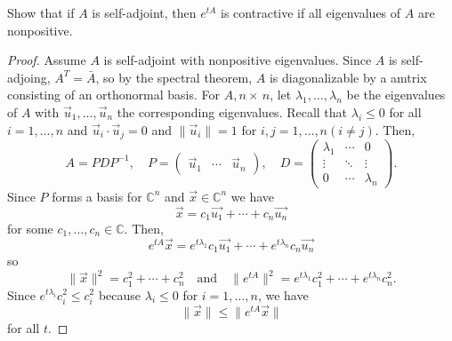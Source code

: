 \documentclass{exam}
\newcommand{\CC}{\mathbb C}
\begin{document}
    \begin{questions}
        \question Show that if $A$ is self-adjoint, then $e^{tA}$ is contractive if all eigenvalues of $A$ are nonpositive. 
        \begin{solution}
            \begin{proof}
                Assume $A$ is self-adjoint with nonpositive eigenvalues. Since $A$ is self-adjoing, $A^{T} = \bar{A}$, so by the spectral theorem, $A$ is diagonalizable by a amtrix consisting of an orthonormal basis. For $A, n\times\,n$, let $\lambda_1, \ldots, \lambda_n$ be the eigenvalues of $A$ with $\vec{u}_1, \ldots, \vec{u}_n$ the corresponding eigenvalues. Recall that $\lambda_i \leq 0$ for all $i = 1, \ldots, n$ and $\vec{u}_i \cdot \vec{u}_j = 0$ and $\|\vec{u}_i\| = 1$ for $i, j = 1, \ldots, n (i \neq j)$. Then, 
                \[
                    A = PDP^{-1}, \quad P = \begin{pmatrix}
                        \vec{u}_1 & \cdots & \vec{u}_n
                    \end{pmatrix}, \quad D = \begin{pmatrix}
                        \lambda_1 & \cdots & 0 \\
                        \vdots & \ddots & \vdots \\
                        0 & \cdots & \lambda_n 
                    \end{pmatrix}.
                \]
                Since $P$ forms a basis for $\CC^n$ and $\vec{x} \in \CC^n$ we have 
                \[
                    \vec{x} = c_1\vec{u_1} + \cdots + c_n\vec{u_n}
                \]
                for some $c_1, \ldots, c_n \in \CC$. Then, 
                \[
                    e^{tA}\vec{x} = e^{t\lambda_1}c_1\vec{u_1} + \cdots + e^{t\lambda_n}c_n\vec{u_n}
                \]
                so
                \[
                    \|\vec{x}\|^2 = c_1^2 + \cdots + c_n^2 \quad\text{and}\quad \|e^{tA}\|^2 = e^{t\lambda_1}c_1^2 + \cdots + e^{t\lambda_n}c_n^2.
                \]
                Since $e^{t\lambda_i}c_{i}^2 \leq c_i^2$ because $\lambda_i \leq 0$ for $i = 1, \ldots, n$, we have 
                \[
                    \|\vec{x}\| \leq \|e^{tA}\vec{x}\|
                \]
                for all $t$.
            \end{proof}
        \end{solution}


\end{questions}
\end{document}
